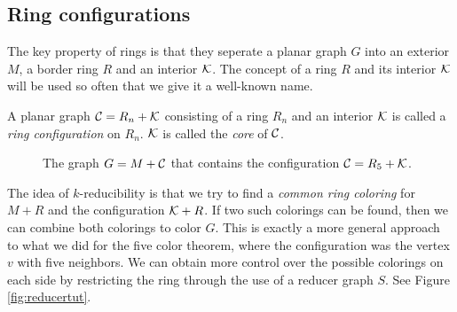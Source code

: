 \subsection{Ring configurations}

The key property of rings is that they seperate a planar graph $G$ into an exterior $M$, a border ring $R$ and an interior $\mathcal{K}$. The concept of a ring $R$ and its interior $\mathcal{K}$ will be used so often that we give it a well-known name.

\begin{definition}
    A planar graph $\mathcal{C} = R_n + \mathcal{K}$ consisting of a ring $R_n$ and an interior $\mathcal{K}$ is called a \emph{ring configuration} on $R_n$. $\mathcal{K}$ is called the \emph{core} of $\mathcal{C}$.
\end{definition}

\begin{figure}[!h]
    \centering
    \caption{The graph $G=M + \mathcal{C}$ that contains the configuration $\mathcal{C}=R_5 + \mathcal{K}$.}
\end{figure}

The idea of $k$-reducibility is that we try to find a \textit{common ring coloring} for $M+R$ and the configuration $\mathcal{K}+R$. If two such colorings can be found, then we can combine both colorings to color $G$. This is exactly a more general approach to what we did for the five color theorem, where the configuration was the vertex $v$ with five neighbors. We can obtain more control over the possible colorings on each side by restricting the ring through the use of a reducer graph $S$. See Figure \ref{fig:reducertut}.

